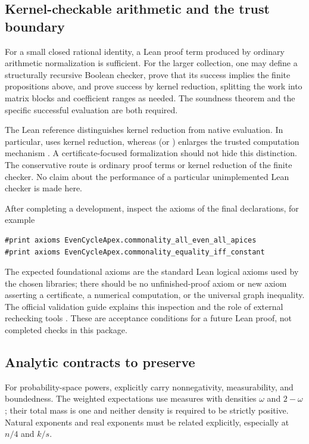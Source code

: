 \subsection{Kernel-checkable arithmetic and the trust boundary}
For a small closed rational identity, a Lean proof term produced by ordinary arithmetic
normalization is sufficient.  For the larger collection, one may define a structurally
recursive Boolean checker, prove that its success implies the finite propositions above,
and prove success by kernel reduction, splitting the work into matrix blocks and coefficient
ranges as needed.  The soundness theorem and the specific successful evaluation are both
required.

The Lean reference distinguishes kernel reduction from native evaluation.  In particular,
 uses kernel reduction, whereas  (or
) enlarges the trusted computation mechanism \cite{leanmanual}.
A certificate-focused formalization should not hide this distinction.  The conservative
route is ordinary proof terms or kernel reduction of the finite checker.  No claim about
the performance of a particular unimplemented Lean checker is made here.

After completing a development, inspect the axioms of the final declarations, for example
\begin{verbatim}
#print axioms EvenCycleApex.commonality_all_even_all_apices
#print axioms EvenCycleApex.commonality_equality_iff_constant
\end{verbatim}
The expected foundational axioms are the standard Lean logical axioms used by the chosen
libraries; there should be no unfinished-proof axiom or new axiom asserting a certificate,
a numerical computation, or the universal graph inequality.  The official validation guide
explains this inspection and the role of external rechecking tools \cite{leanvalidation}.
These are acceptance conditions for a future Lean proof, not completed checks in this
package.

\subsection{Analytic contracts to preserve}
For probability-space powers, explicitly carry nonnegativity, measurability, and boundedness.
The weighted expectations use measures with densities $\omega$ and $2-\omega$; their total
mass is one and neither density is required to be strictly positive.  Natural exponents and
real exponents must be related explicitly, especially at $n/4$ and $k/s$.

